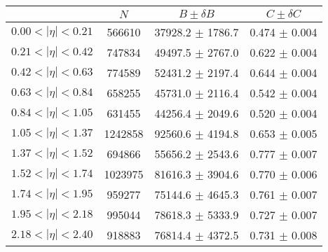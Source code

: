 \begin{tabular}{lccc}
\hline
    &   $N$   & $B \pm \delta B$  &  $C \pm \delta C$ \\
\hline
$0.00 < |\eta| <0.21$          & 566610     & 37928.2    $\pm$ 1786.7 & 0.474      $\pm$ 0.004 \\
$0.21 < |\eta| <0.42$          & 747834     & 49497.5    $\pm$ 2767.0 & 0.622      $\pm$ 0.004 \\
$0.42 < |\eta| <0.63$          & 774589     & 52431.2    $\pm$ 2197.4 & 0.644      $\pm$ 0.004 \\
$0.63 < |\eta| <0.84$          & 658255     & 45731.0    $\pm$ 2116.4 & 0.542      $\pm$ 0.004 \\
$0.84 < |\eta| <1.05$          & 631455     & 44256.4    $\pm$ 2049.6 & 0.520      $\pm$ 0.004 \\
$1.05 < |\eta| <1.37$          & 1242858    & 92560.6    $\pm$ 4194.8 & 0.653      $\pm$ 0.005 \\
$1.37 < |\eta| <1.52$          & 694866     & 55656.2    $\pm$ 2543.6 & 0.777      $\pm$ 0.007 \\
$1.52 < |\eta| <1.74$          & 1023975    & 81616.3    $\pm$ 3904.6 & 0.770      $\pm$ 0.006 \\
$1.74 < |\eta| <1.95$          & 959277     & 75144.6    $\pm$ 4645.3 & 0.761      $\pm$ 0.007 \\
$1.95 < |\eta| <2.18$          & 995044     & 78618.3    $\pm$ 5333.9 & 0.727      $\pm$ 0.007 \\
$2.18 < |\eta| <2.40$          & 918883     & 76814.4    $\pm$ 4372.5 & 0.731      $\pm$ 0.008 \\
\hline
\end{tabular}
